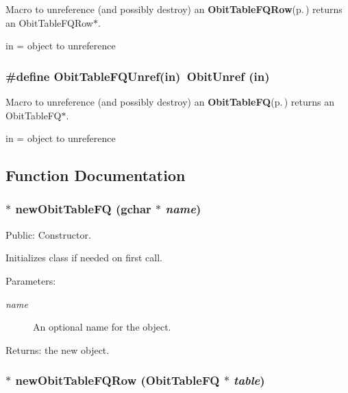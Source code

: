 Macro to unreference (and possibly destroy) an {\bf Obit\-Table\-FQRow}{\rm (p.\,\pageref{structObitTableFQRow})} returns an Obit\-Table\-FQRow$\ast$. 

in = object to unreference 
\subsubsection{\setlength{\rightskip}{0pt plus 5cm}\#define Obit\-Table\-FQUnref(in)\ Obit\-Unref (in)}\label{ObitTableFQ_8h_a1}


Macro to unreference (and possibly destroy) an {\bf Obit\-Table\-FQ}{\rm (p.\,\pageref{structObitTableFQ})} returns an Obit\-Table\-FQ$\ast$. 

in = object to unreference 

\subsection{Function Documentation}
\subsubsection{$\ast$ new\-Obit\-Table\-FQ (gchar $\ast$ {\em name})}\label{ObitTableFQ_8h_a11}


Public: Constructor. 

Initializes class if needed on first call. \begin{Desc}
\item[Parameters:]
\begin{description}
\item[{\em name}]An optional name for the object. \end{description}
\end{Desc}
\begin{Desc}
\item[Returns:]the new object. \end{Desc}
\subsubsection{$\ast$ new\-Obit\-Table\-FQRow ({\bf Obit\-Table\-FQ} $\ast$ {\em table})}\label{ObitTableFQ_8h_a8}


